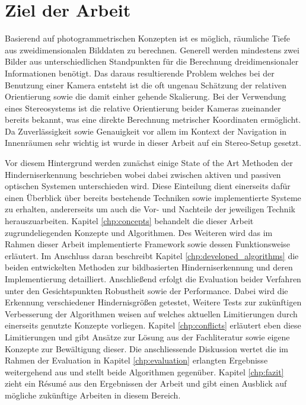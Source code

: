 \section{Ziel der Arbeit}
\label{sec:ziel_der_arbeit}
Basierend auf photogrammetrischen Konzepten ist es möglich, räumliche Tiefe aus zweidimensionalen Bilddaten zu berechnen. Generell werden mindestens zwei Bilder aus unterschiedlichen Standpunkten für die Berechnung dreidimensionaler Informationen benötigt. Das daraus resultierende Problem welches bei der Benutzung einer Kamera entsteht ist die oft ungenau Schätzung der relativen Orientierung sowie die damit einher gehende Skalierung. Bei der Verwendung eines Stereosystems ist die relative Orientierung beider Kameras zueinander bereits bekannt, was eine direkte Berechnung metrischer Koordinaten ermöglicht. Da Zuverlässigkeit sowie Genauigkeit vor allem im Kontext der Navigation in Innenräumen sehr wichtig ist wurde in dieser Arbeit auf ein Stereo-Setup gesetzt.

\noindent
Vor diesem Hintergrund werden zunächst einige State of the Art Methoden der Hinderniserkennung beschrieben wobei dabei zwischen aktiven und passiven optischen Systemen unterschieden wird. Diese Einteilung dient einerseits dafür einen Überblick über bereits bestehende Techniken sowie implementierte Systeme zu erhalten, andererseits um auch die Vor- und Nachteile der jeweiligen Technik herauszuarbeiten. Kapitel \ref{chp:concepts} behandelt die dieser Arbeit zugrundeliegenden Konzepte und Algorithmen. Des Weiteren wird das im Rahmen dieser Arbeit implementierte Framework sowie dessen Funktionsweise erläutert. Im Anschluss daran beschreibt Kapitel \ref{chp:developed_algorithms} die beiden entwickelten Methoden zur bildbasierten Hinderniserkennung und deren Implementierung detailliert. Anschließend erfolgt die Evaluation beider Verfahren unter den Gesichtspunkten Robustheit sowie der Performance. Dabei wird die Erkennung verschiedener Hindernisgrößen getestet, 
Weitere Tests zur zukünftigen Verbesserung der Algorithmen weisen auf welches aktuellen Limitierungen durch einerseits genutzte Konzepte vorliegen. Kapitel \ref{chp:conflicts} erläutert eben diese Limitierungen und gibt Ansätze zur Lösung aus der Fachliteratur sowie eigene Konzepte zur Bewältigung dieser. Die anschliessende Diskussion wertet die im Rahmen der Evaluation in Kapitel \ref{chp:evaluation} erlangten Ergebnisse weitergehend aus und stellt beide Algorithmen gegenüber. Kapitel \ref{chp:fazit} zieht ein Ré­su­mé aus den Ergebnissen der Arbeit und gibt einen Ausblick auf mögliche zukünftige Arbeiten in diesem Bereich.
